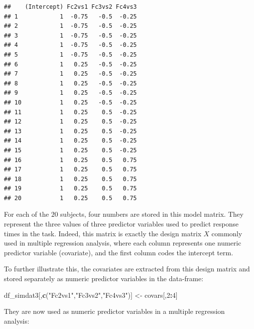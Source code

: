 \documentclass[12pt,]{krantz}
\newenvironment{Shaded}{\begin{snugshade}}{\end{snugshade}}
\newcommand{\KeywordTok}[1]{\textcolor[rgb]{0.13,0.29,0.53}{\textbf{#1}}}
\newcommand{\DecValTok}[1]{\textcolor[rgb]{0.00,0.00,0.81}{#1}}
\newcommand{\StringTok}[1]{\textcolor[rgb]{0.31,0.60,0.02}{#1}}
\newcommand{\OperatorTok}[1]{\textcolor[rgb]{0.81,0.36,0.00}{\textbf{#1}}}
\newcommand{\NormalTok}[1]{#1}
\theoremstyle{definition}
\theoremstyle{definition}
\theoremstyle{definition}
\theoremstyle{remark}
\begin{document}
\begin{verbatim}
##    (Intercept) Fc2vs1 Fc3vs2 Fc4vs3
## 1            1  -0.75   -0.5  -0.25
## 2            1  -0.75   -0.5  -0.25
## 3            1  -0.75   -0.5  -0.25
## 4            1  -0.75   -0.5  -0.25
## 5            1  -0.75   -0.5  -0.25
## 6            1   0.25   -0.5  -0.25
## 7            1   0.25   -0.5  -0.25
## 8            1   0.25   -0.5  -0.25
## 9            1   0.25   -0.5  -0.25
## 10           1   0.25   -0.5  -0.25
## 11           1   0.25    0.5  -0.25
## 12           1   0.25    0.5  -0.25
## 13           1   0.25    0.5  -0.25
## 14           1   0.25    0.5  -0.25
## 15           1   0.25    0.5  -0.25
## 16           1   0.25    0.5   0.75
## 17           1   0.25    0.5   0.75
## 18           1   0.25    0.5   0.75
## 19           1   0.25    0.5   0.75
## 20           1   0.25    0.5   0.75
\end{verbatim}

For each of the \(20\) subjects, four numbers are stored in this model
matrix. They represent the three values of three predictor variables
used to predict response times in the task. Indeed, this matrix is
exactly the design matrix \(X\) commonly used in multiple regression
analysis, where each column represents one numeric predictor variable
(covariate), and the first column codes the intercept term.

To further illustrate this, the covariates are extracted from this
design matrix and stored separately as numeric predictor variables in
the data-frame:

\begin{Shaded}
\begin{Highlighting}[]
\NormalTok{df_simdat3[,}\KeywordTok{c}\NormalTok{(}\StringTok{"Fc2vs1"}\NormalTok{,}\StringTok{"Fc3vs2"}\NormalTok{,}\StringTok{"Fc4vs3"}\NormalTok{)] <-}\StringTok{ }\NormalTok{covars[,}\DecValTok{2}\OperatorTok{:}\DecValTok{4}\NormalTok{]}
\end{Highlighting}
\end{Shaded}

They are now used as numeric predictor variables in a multiple
regression analysis:
\end{document}
